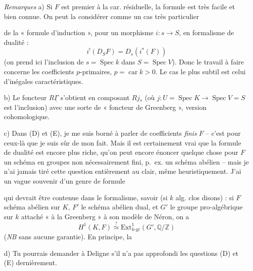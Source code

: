 \documentclass[11pt,a4paper]{article}
\begin{document}
\emph{Remarques} a) Si $F$ est premier à la car. résiduelle, la formule est très facile et bien connue. On peut la considérer comme un cas très particulier

de la « formule d'induction », pour un morphisme $i : s \to S$, en formalisme de dualité :
\[
i^!(D_S F) = D_s(i^*(F))
\]
(on prend ici l'inclusion de $s = \operatorname{Spec} k$ dans $S = \operatorname{Spec} V$). Donc le travail à faire concerne les coefficients $p$-primaires, $p = \operatorname{car} k > 0$. Le cas le plus subtil est celui d'inégales caractéristiques.

b) Le foncteur $R\underline{\Gamma}$ s'obtient en composant $Rj_*$ (où $j : U = \operatorname{Spec} K \to \operatorname{Spec} V = S$ est l'inclusion) avec une sorte de « foncteur de Greenberg », version cohomologique.

c) Dans (D) et (E), je me suis borné à parler de coefficients \emph{finis} $F$ -- c'est pour ceux-là que je suis sûr de mon fait. Mais il est certainement vrai que la formule de dualité est encore plus riche, qu'on peut encore énoncer quelque chose  pour $F$ un schéma en groupes non nécessairement fini, p.~ex. un schéma abélien  -- mais je n'ai jamais tiré cette question entièrement au clair, même heuristiquement. J'ai un vague souvenir d'un genre de formule

qui devrait être contenue dans le formalisme, savoir (si $k$ alg. clos disons) : si $F$ schéma abélien sur $K$, $F'$ le schéma abélien dual, et $G'$ le groupe pro-algébrique sur $k$ attaché « à la Greenberg » à son modèle de Néron, on a
\[
H^1(K, F) \overset{?}{\simeq} \mathrm{Ext}^1_{k\text{-gr}}(G', \mathbb{Q}/\mathbb{Z})
\]
(\emph{NB} sans aucune garantie). En principe, la 

d) Tu pourrais demander à Deligne s'il n'a pas approfondi les questions (D) et (E) dernièrement.
\end{document}
